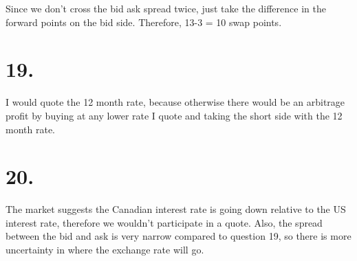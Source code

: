 \documentclass[paper=a4, fontsize=11pt]{scrartcl} %
\numberwithin{equation}{section} %
\numberwithin{figure}{section} %
\numberwithin{table}{section} %
\begin{document}
Since we don't cross the bid ask spread twice, just take the difference in the forward points on the bid side.  Therefore, 13-3 = 10 swap points.  


\section*{19.}

I would quote the 12 month rate, because otherwise there would be an arbitrage profit by buying at any lower rate I quote and taking the short side with the 12 month rate.   


\section*{20.}

The market suggests the Canadian interest rate is going down relative to the US interest rate, therefore we wouldn't participate in a quote.  Also, the spread between the bid and ask is very narrow compared to question 19, so there is more uncertainty in where the exchange rate will go. 


\end{document}
